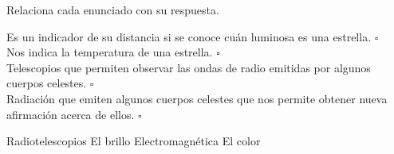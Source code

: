 Relaciona cada enunciado con su respuesta.

\begin{multicols}{2}
    \begin{flushright}
        Es un indicador de su distancia si se conoce cuán luminosa es una
        estrella. $\square$\\ \vspace{0.5cm}
        Nos indica la temperatura de una estrella. $\square$\\ \vspace{0.5cm}
        Telescopios que permiten observar las ondas de radio emitidas por
        algunos cuerpos celestes. $\square$\\ \vspace{0.5cm}
        Radiación que emiten algunos cuerpos celestes que nos permite obtener
        nueva afirmación acerca de ellos. $\square$\\ \vspace{0.5cm}
    \end{flushright}
    \vspace{1cm}
    \begin{checkboxes}
        \choice Radiotelescopios \vspace{0.8cm}
        \choice El brillo	 \vspace{0.8cm}
        \choice Electromagnética \vspace{0.8cm}
        \choice El color	 \vspace{0.8cm}
    \end{checkboxes}
\end{multicols}
